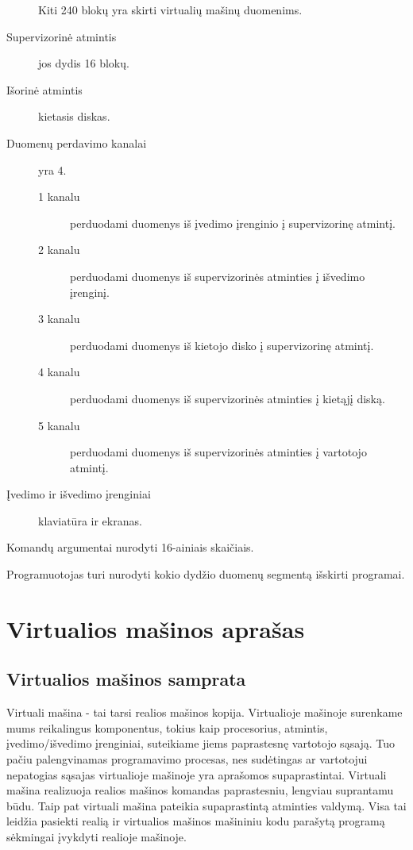 \begin{description}
    Kiti 240 blokų yra skirti virtualių mašinų duomenims.
  \item[Supervizorinė atmintis] jos dydis 16 blokų.
  \item[Išorinė atmintis] kietasis diskas.
  \item[Duomenų perdavimo kanalai] yra 4. 
    \begin{description}
      \item[1 kanalu] perduodami duomenys iš įvedimo įrenginio į 
        supervizorinę atmintį.
      \item[2 kanalu] perduodami duomenys iš supervizorinės atminties
        į išvedimo įrenginį.
      \item[3 kanalu] perduodami duomenys iš kietojo disko į supervizorinę
        atmintį.
      \item[4 kanalu] perduodami duomenys iš supervizorinės atminties į 
        kietąjį diską.
      \item[5 kanalu] perduodami duomenys iš supervizorinės atminties į 
        vartotojo atmintį.
    \end{description}
  \item[Įvedimo ir išvedimo įrenginiai] klaviatūra ir ekranas.
\end{description}

Komandų argumentai nurodyti 16-ainiais skaičiais.

Programuotojas turi nurodyti kokio dydžio duomenų segmentą 
išskirti programai.

\section{Virtualios mašinos aprašas}

\subsection{Virtualios mašinos samprata}

Virtuali mašina - tai tarsi realios mašinos kopija. Virtualioje mašinoje
surenkame mums reikalingus komponentus, tokius kaip procesorius,
atmintis, įvedimo/išvedimo įrenginiai, suteikiame jiems paprastesnę
vartotojo sąsają. Tuo pačiu palengvinamas programavimo procesas,
nes sudėtingas ar vartotojui nepatogias sąsajas virtualioje mašinoje yra 
aprašomos supaprastintai. Virtuali mašina realizuoja realios mašinos
komandas paprastesniu, lengviau suprantamu būdu. Taip pat virtuali mašina
pateikia supaprastintą atminties valdymą. Visa tai leidžia pasiekti realią
ir virtualios mašinos mašininiu kodu parašytą programą sėkmingai įvykdyti
realioje mašinoje. 
